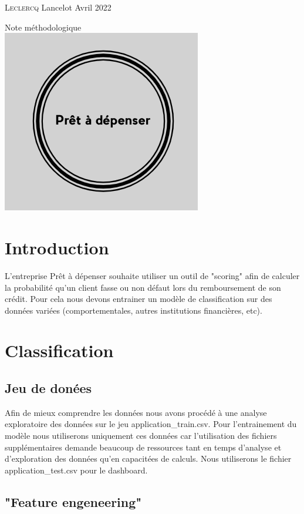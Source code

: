 \documentclass[12pt, a4paper]{article}
\begin{document}
\date{mai 2022}
\begin{titlepage}
    \large{\textsc{Leclercq} Lancelot} \hfill \normalsize{Avril 2022}
    \vfill
    \begin{center}
        \huge{Note méthodologique}\\
        \vfill
        \includegraphics[width=.3\textwidth]{logoPAD.png}\\
    \end{center}
    \vfill
    \renewcommand{\contentsname}{Sommaire}
    \pdfbookmark{\contentsname}{toc}
    \tableofcontents
\end{titlepage}

\section{Introduction}

L'entreprise Prêt à dépenser souhaite utiliser un outil de "scoring" afin de calculer la probabilité qu'un client fasse ou non défaut lors du remboursement de son crédit. Pour cela nous devons entrainer un modèle de classification sur des données variées (comportementales, autres institutions financières, etc).

\section{Classification}
\subsection{Jeu de donées}

Afin de mieux comprendre les données nous avons procédé à une analyse exploratoire des données sur le jeu application\_train.csv. Pour l'entrainement du modèle nous utiliserons uniquement ces données car l'utilisation des fichiers supplémentaires demande beaucoup de ressources tant en temps d'analyse et d'exploration des données qu'en capacitées de calculs. Nous utiliserons le fichier application\_test.csv pour le dashboard.

\subsection{"Feature engeneering"}
\end{document}
